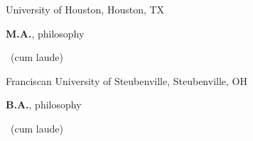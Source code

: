 {
	University of Houston, Houston, TX}
{
	\textbf{M.A.}, philosophy\begin{footnotesize}
		~(cum laude)
\end{footnotesize}}
{}
{
	Franciscan University of Steubenville, Steubenville, OH}
{
	\textbf{B.A.}, philosophy\begin{footnotesize}
		~(cum laude)
\end{footnotesize}}
{}
